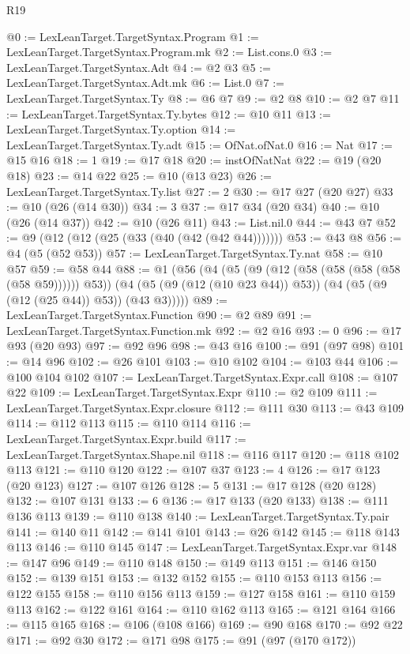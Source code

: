 \begin{lexlean}{R19}
\begin{coremodule}
@0 := LexLeanTarget.TargetSyntax.Program
@1 := LexLeanTarget.TargetSyntax.Program.mk
@2 := List.cons.{0}
@3 := LexLeanTarget.TargetSyntax.Adt
@4 := @2 @3
@5 := LexLeanTarget.TargetSyntax.Adt.mk
@6 := List.{0}
@7 := LexLeanTarget.TargetSyntax.Ty
@8 := @6 @7
@9 := @2 @8
@10 := @2 @7
@11 := LexLeanTarget.TargetSyntax.Ty.bytes
@12 := @10 @11
@13 := LexLeanTarget.TargetSyntax.Ty.option
@14 := LexLeanTarget.TargetSyntax.Ty.adt
@15 := OfNat.ofNat.{0}
@16 := Nat
@17 := @15 @16
@18 := 1
@19 := @17 @18
@20 := instOfNatNat
@22 := @19 (@20 @18)
@23 := @14 @22
@25 := @10 (@13 @23)
@26 := LexLeanTarget.TargetSyntax.Ty.list
@27 := 2
@30 := @17 @27 (@20 @27)
@33 := @10 (@26 (@14 @30))
@34 := 3
@37 := @17 @34 (@20 @34)
@40 := @10 (@26 (@14 @37))
@42 := @10 (@26 @11)
@43 := List.nil.{0}
@44 := @43 @7
@52 := @9 (@12 (@12 (@25 (@33 (@40 (@42 (@42 @44)))))))
@53 := @43 @8
@56 := @4 (@5 (@52 @53))
@57 := LexLeanTarget.TargetSyntax.Ty.nat
@58 := @10 @57
@59 := @58 @44
@88 := @1
    (@56
      (@4
        (@5 (@9 (@12 (@58 (@58 (@58 (@58 (@58 @59)))))) @53))
        (@4 (@5 (@9 (@12 (@10 @23 @44)) @53)) (@4 (@5 (@9 (@12 (@25 @44)) @53)) (@43 @3)))))
@89 := LexLeanTarget.TargetSyntax.Function
@90 := @2 @89
@91 := LexLeanTarget.TargetSyntax.Function.mk
@92 := @2 @16
@93 := 0
@96 := @17 @93 (@20 @93)
@97 := @92 @96
@98 := @43 @16
@100 := @91 (@97 @98)
@101 := @14 @96
@102 := @26 @101
@103 := @10 @102
@104 := @103 @44
@106 := @100 @104 @102
@107 := LexLeanTarget.TargetSyntax.Expr.call
@108 := @107 @22
@109 := LexLeanTarget.TargetSyntax.Expr
@110 := @2 @109
@111 := LexLeanTarget.TargetSyntax.Expr.closure
@112 := @111 @30
@113 := @43 @109
@114 := @112 @113
@115 := @110 @114
@116 := LexLeanTarget.TargetSyntax.Expr.build
@117 := LexLeanTarget.TargetSyntax.Shape.nil
@118 := @116 @117
@120 := @118 @102 @113
@121 := @110 @120
@122 := @107 @37
@123 := 4
@126 := @17 @123 (@20 @123)
@127 := @107 @126
@128 := 5
@131 := @17 @128 (@20 @128)
@132 := @107 @131
@133 := 6
@136 := @17 @133 (@20 @133)
@138 := @111 @136 @113
@139 := @110 @138
@140 := LexLeanTarget.TargetSyntax.Ty.pair
@141 := @140 @11
@142 := @141 @101
@143 := @26 @142
@145 := @118 @143 @113
@146 := @110 @145
@147 := LexLeanTarget.TargetSyntax.Expr.var
@148 := @147 @96
@149 := @110 @148
@150 := @149 @113
@151 := @146 @150
@152 := @139 @151
@153 := @132 @152
@155 := @110 @153 @113
@156 := @122 @155
@158 := @110 @156 @113
@159 := @127 @158
@161 := @110 @159 @113
@162 := @122 @161
@164 := @110 @162 @113
@165 := @121 @164
@166 := @115 @165
@168 := @106 (@108 @166)
@169 := @90 @168
@170 := @92 @22
@171 := @92 @30
@172 := @171 @98
@175 := @91 (@97 (@170 @172))

\end{coremodule}
\end{lexlean}
